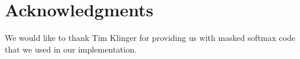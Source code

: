 \documentclass[11pt]{article}
\begin{document}
\section*{Acknowledgments}

We would like to thank Tim Klinger for providing us with masked softmax code that we used in our implementation.














\end{document}
